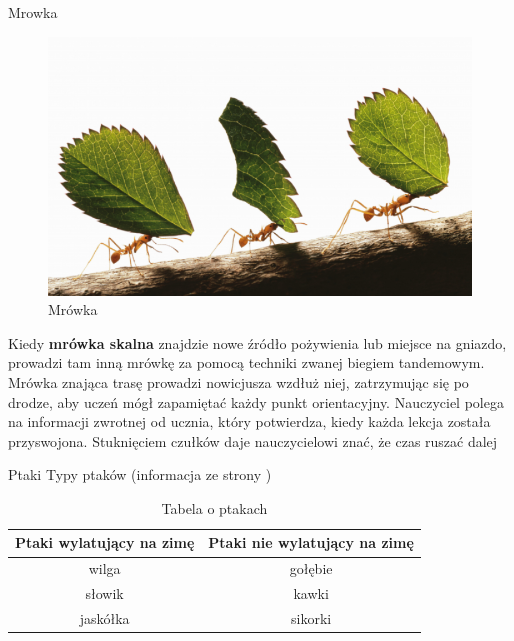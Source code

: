 \documentclass[hyperref={colorlinks = true,linkcolor = black}]{beamer}
\begin{document}
\begin{frame}{Mrowka}
\begin{figure}
\includegraphics[scale=0.28]{mrowka.png}
\caption{Mrówka}
\label{fig:obr6}
\end{figure}
Kiedy \textbf{mrówka skalna} znajdzie nowe źródło pożywienia lub miejsce na gniazdo, prowadzi tam inną mrówkę za pomocą techniki zwanej biegiem tandemowym. Mrówka znająca trasę prowadzi nowicjusza wzdłuż niej, zatrzymując się po drodze, aby uczeń mógł zapamiętać każdy punkt orientacyjny. Nauczyciel polega na informacji zwrotnej od ucznia, który potwierdza, kiedy każda lekcja została przyswojona. Stuknięciem czułków daje nauczycielowi znać, że czas ruszać dalej
\end{frame}


\begin{frame}{Ptaki}
Typy ptaków (informacja ze strony \cite{b4})

\begin{table}[h]
\centering
\begin{tabular}{|c | c|}
\hline
 Ptaki wylatujący na zimę &  Ptaki  nie wylatujący na zimę \\
\hline
wilga & gołębie \\ \hline
słowik & kawki \\ \hline
jaskółka & sikorki \\ 
\hline
\end{tabular}
\caption{Tabela o ptakach}
\label{tab:tabelka1}
\end{table}

\end{frame}
\end{document}
